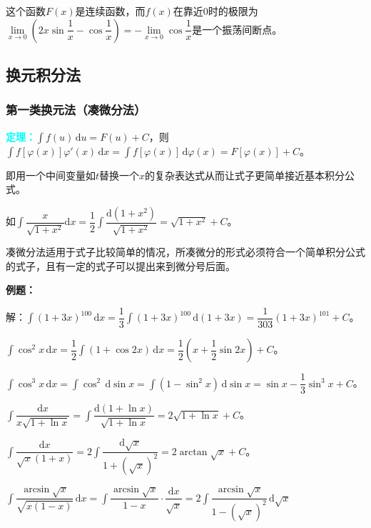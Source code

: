 \documentclass[UTF8, 12pt]{ctexart}
\begin{document}
        这个函数$F(x)$是连续函数，而$f(x)$在靠近0时的极限为$\lim\limits_{x\to 0}(2x\sin\dfrac{1}{x}-\cos\dfrac{1}{x})=-\lim\limits_{x\to 0}\cos\dfrac{1}{x}$是一个振荡间断点。

        \subsection{换元积分法}

        \subsubsection{第一类换元法（凑微分法）}

        \textcolor{aqua}{\textbf{定理：}}$\int f(u)\,\textrm{d}u=F(u)+C$，则$\int f[\varphi(x)]\varphi'(x)\,\textrm{d}x=\int f[\varphi(x)]\,\textrm{d}\varphi(x)=F[\varphi(x)]+C$。

        即用一个中间变量如$t$替换一个$x$的复杂表达式从而让式子更简单接近基本积分公式。

        如$\displaystyle{\int\dfrac{x}{\sqrt{1+x^2}}\textrm{d}x=\dfrac{1}{2}\int\dfrac{\textrm{d}(1+x^2)}{\sqrt{1+x^2}}}=\sqrt{1+x^2}+C$。\medskip

        凑微分法适用于式子比较简单的情况，所凑微分的形式必须符合一个简单积分公式的式子，且有一定的式子可以提出来到微分号后面。

        \textbf{例题：}

        解：$\int(1+3x)^{100}\,\textrm{d}x=\dfrac{1}{3}\int(1+3x)^{100}\,\textrm{d}(1+3x)=\dfrac{1}{303}(1+3x)^{101}+C$。

        $\int\cos^2x\,\textrm{d}x=\dfrac{1}{2}\int(1+\cos 2x)\,\textrm{d}x=\dfrac{1}{2}\left(x+\dfrac{1}{2}\sin 2x\right)+C$。

        $\int\cos^3x\,\textrm{d}x=\int\cos^2\,\textrm{d}\sin x=\int(1-\sin^2x)\,\textrm{d}\sin x=\sin x-\dfrac{1}{3}\sin^3x+C$。\medskip

        $\displaystyle{\int\dfrac{\textrm{d}x}{x\sqrt{1+\ln x}}=\int\dfrac{\textrm{d}(1+\ln x)}{\sqrt{1+\ln x}}}=2\sqrt{1+\ln x}+C$。\medskip

        $\displaystyle{\int\dfrac{\textrm{d}x}{\sqrt{x}(1+x)}=2\int\dfrac{\textrm{d}\sqrt{x}}{1+(\sqrt{x})^2}}=2\arctan\sqrt{x}+C$。\medskip

        $\displaystyle{\int\dfrac{\arcsin\sqrt{x}}{\sqrt{x(1-x)}}\,\textrm{d}x=\int\dfrac{\arcsin\sqrt{x}}{1-x}\cdot\dfrac{\textrm{d}x}{\sqrt{x}}=2\int\dfrac{\arcsin\sqrt{x}}{1-(\sqrt{x})^2}\,\textrm{d}\sqrt{x}}$ \medskip
\end{document}
